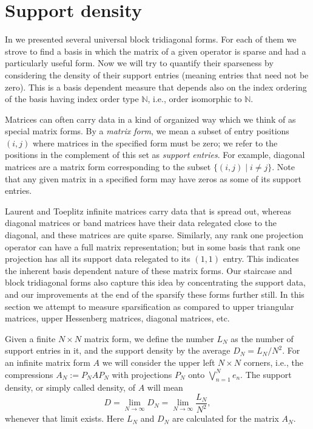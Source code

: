 \documentclass[10pt,reqno]{amsart}
\theoremstyle{remark}
\newcommand{\term}[1]{\emph{#1}}
\numberwithin{equation}{section}
\begin{document}

\section{Support density}
\label{secdens}

In  we presented several universal block tridiagonal forms.
For each of them we strove to find a basis in which the matrix of a given operator is sparse and had a particularly useful form.
Now we will try to quantify their sparseness by considering the density of their support entries (meaning entries that need not be zero).
This is a basis dependent measure that depends also on the index ordering of the basis having index order type $\mathbb{N}$, i.e., order isomorphic to $\mathbb{N}$.

Matrices can often carry data in a kind of organized way which we think of as special matrix forms.
By a \term{matrix form}, we mean a subset of entry positions $(i,j)$ where matrices in the specified form must be zero;
we refer to the positions in the complement of this set as \term{support entries}.
For example, diagonal matrices are a matrix form corresponding to the subset $\{ (i,j) \mid i \neq j \}$.
Note that any given matrix in a specified form may have zeros as some of its support entries.

Laurent and Toeplitz infinite matrices carry data that is spread out, whereas diagonal matrices or band matrices have their data relegated close to the diagonal, and these matrices are quite sparse.
Similarly, any rank one projection operator can have a full matrix representation; but in some basis that rank one projection has all its support data relegated to its $(1,1)$ entry.
This indicates the inherent basis dependent nature of these matrix forms.
Our staircase and block tridiagonal forms also capture this idea by concentrating the support data, and our improvements at the end of the  sparsify these forms further still.
In this section we attempt to measure sparsification as compared to upper triangular matrices, upper Hessenberg matrices, diagonal matrices, etc.

Given a finite $N\times N$ matrix form, we define the number $L_N$ as the number of support entries in it, and the support density by the average $D_N=L_N/N^2$.
For an infinite matrix form $A$ we will consider the upper left $N\times N$ corners, i.e., the compressions $A_N :=P_NAP_N$ with projections $P_N$ onto $\bigvee_{n=1}^N e_n$.
The support density, or simply called density, of $A$ will mean
\begin{equation}
  \label{density}
  D=\lim_{N\to\infty} D_N=
  \lim_{N\to\infty} \frac{L_N}{N^2},
\end{equation}
whenever that limit exists.
Here $L_N$ and $D_N$ are calculated for the matrix $A_N$.
\end{document}
